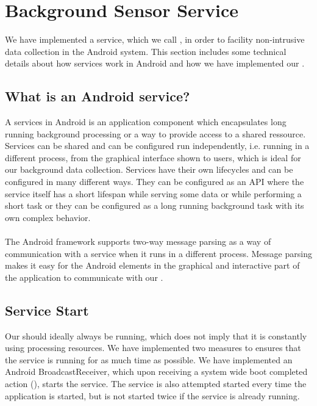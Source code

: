 
\section{Background Sensor Service}
\label{sec:background_sensor_service}
We have implemented a service, which we call , in order to facility non-intrusive data collection in the Android system.
This section includes some technical details about how services work in Android and how we have implemented our . 

\subsection{What is an Android service?}
A services in Android is an application component which encapsulates long running background processing or a way to provide access to a shared ressource. Services can be shared and can be configured run independently, i.e. running in a different process, from the graphical interface shown to users, which is ideal for our background data collection. Services have their own lifecycles and can be configured in many different ways. They can be configured as an API where the service itself has a short lifespan while serving some data or while performing a short task or they can be configured as a long running background task with its own complex behavior.
\\\\
The Android framework supports two-way message parsing as a way of communication with a service when it runs in a different process. Message parsing makes it easy for the Android  elements in the graphical and interactive part of the application to communicate with our .

\subsection{Service Start}
Our  should ideally always be running, which does not imply that it is constantly using processing resources. We have implemented two measures to ensures that the service is running for as much time as possible. We have implemented an Android BroadcastReceiver, which upon receiving a system wide boot completed action (), starts the service. The service is also attempted started every time the application is started, but is not started twice if the service is already running. 

